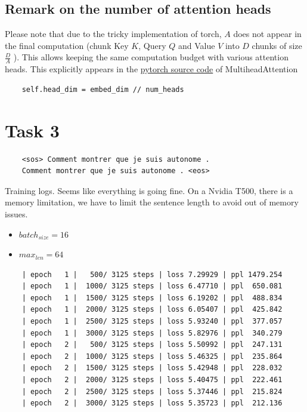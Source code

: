 \documentclass[a4paper]{article}
\begin{document}
\subsection*{Remark on the number of attention heads}
Please note that due to the tricky implementation of torch,
$A$ does not appear in the final computation (chunk Key $K$, Query $Q$ and Value $V$ into $D$ chunks of  size $\frac{D}{A}$ ).
This allows keeping the same computation budget with various attention heads.
This explicitly appears in the \href{https://github.com/pytorch/pytorch/blob/main/torch/nn/modules/activation.py#L990}{pytorch source code}
of MultiheadAttention
\begin{verbatim}
    self.head_dim = embed_dim // num_heads
\end{verbatim}

\section*{Task 3}
\begin{verbatim}
    <sos> Comment montrer que je suis autonome .
    Comment montrer que je suis autonome . <eos>
\end{verbatim}

Training logs. Seems like everything is going fine.
On a Nvidia T500, there is a memory limitation, we have to limit the sentence length to avoid out of memory issues.


\begin{itemize}
    \item $batch_{size} = 16$
    \item $max_{len} = 64$
\end{itemize}

\begin{verbatim}
    | epoch   1 |   500/ 3125 steps | loss 7.29929 | ppl 1479.254
    | epoch   1 |  1000/ 3125 steps | loss 6.47710 | ppl  650.081
    | epoch   1 |  1500/ 3125 steps | loss 6.19202 | ppl  488.834
    | epoch   1 |  2000/ 3125 steps | loss 6.05407 | ppl  425.842
    | epoch   1 |  2500/ 3125 steps | loss 5.93240 | ppl  377.057
    | epoch   1 |  3000/ 3125 steps | loss 5.82976 | ppl  340.279
    | epoch   2 |   500/ 3125 steps | loss 5.50992 | ppl  247.131
    | epoch   2 |  1000/ 3125 steps | loss 5.46325 | ppl  235.864
    | epoch   2 |  1500/ 3125 steps | loss 5.42948 | ppl  228.032
    | epoch   2 |  2000/ 3125 steps | loss 5.40475 | ppl  222.461
    | epoch   2 |  2500/ 3125 steps | loss 5.37446 | ppl  215.824
    | epoch   2 |  3000/ 3125 steps | loss 5.35723 | ppl  212.136
\end{verbatim}
\end{document}
